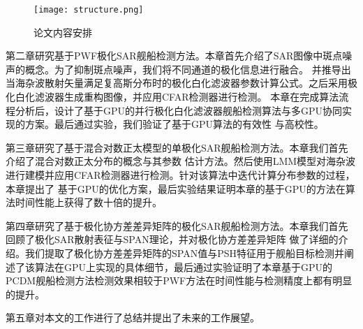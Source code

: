   \begin{figure}[H] %
    \centering
    \texttt{[image: structure.png]}
    \caption{论文内容安排}
    \label{fig:chap1:structure}
  \end{figure}

  第二章研究基于PWF极化SAR舰船检测方法。本章首先介绍了SAR图像中斑点噪声的概念。为了抑制斑点噪声，我们将不同通道的极化信息进行融合。
  并推导出当海杂波散射矢量满足复高斯分布时的极化白化滤波器参数计算公式。之后采用极化白化滤波器生成重构图像，并应用CFAR检测器进行检测。
  本章在完成算法流程分析后，设计了基于GPU的并行极化白化滤波器舰船检测算法与多GPU协同实现的方案。最后通过实验，我们验证了基于GPU算法的有效性
  与高校性。

  第三章研究了基于混合对数正太模型的单极化SAR舰船检测方法。本章我们首先介绍了混合对数正太分布的概念与其参数
  估计方法。然后使用LMM模型对海杂波进行建模并应用CFAR检测器进行检测。针对该算法中迭代计算分布参数的过程，本章提出了
  基于GPU的优化方案，最后实验结果证明本章的基于GPU的方法在算法时间性能上获得了数十倍的提升。

  第四章研究了基于极化协方差差异矩阵的极化SAR舰船检测方法。本章我们首先回顾了极化SAR散射表征与SPAN理论，并对极化协方差差异矩阵
  做了详细的介绍。我们提取了极化协方差差异矩阵的SPAN值与PSH特征用于舰船目标检测并阐述了该算法在GPU上实现的具体细节，最后通过实验证明了本章基于GPU的
  PCDM舰船检测方法检测效果相较于PWF方法在时间性能与检测精度上都有明显的提升。

  第五章对本文的工作进行了总结并提出了未来的工作展望。